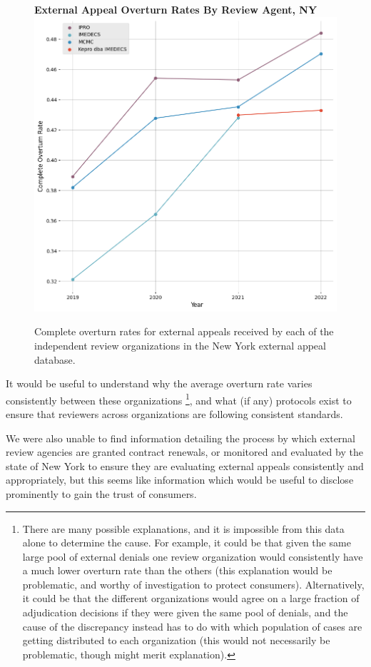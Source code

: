 \documentclass[12pt, a4paper,twoside]{report}
\theoremstyle{plain} %
\theoremstyle{definition} %
\theoremstyle{remark} %
\numberwithin{equation}{chapter}
\begin{document}
		\begin{figure}[h!]
			\centering
			\textbf{External Appeal Overturn Rates By Review Agent, NY}
			\includegraphics[width=.8\textwidth]{images/nys_external/external_appeal_overturn_rates_by_review_org.png}
			\caption{Complete overturn rates for external appeals received by each of the independent review organizations in the New York external appeal database.}
			\label{nyexternalappealoverturnratebyreviewagentovertime}
		\end{figure}
	
		It would be useful to understand why the average overturn rate varies consistently between these organizations \footnote{There are many possible explanations, and it is impossible from this data alone to determine the cause. For example, it could be that given the same large pool of external denials one review organization would consistently have a much lower overturn rate than the others (this explanation would be problematic, and worthy of investigation to protect consumers). Alternatively, it could be that the different organizations would agree on a large fraction of adjudication decisions if they were given the same pool of denials, and the cause of the discrepancy instead has to do with which population of cases are getting distributed to each organization (this would not necessarily be problematic, though might merit explanation).}, and what (if any) protocols exist to ensure that reviewers across organizations are following consistent standards.
		
		We were also unable to find information detailing the process by which external review agencies are granted contract renewals, or monitored and evaluated by the state of New York to ensure they are evaluating external appeals consistently and appropriately, but this seems like information which would be useful to disclose prominently to gain the trust of consumers.
		
\end{document}
